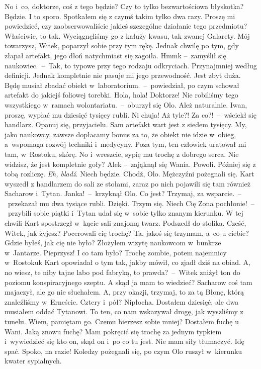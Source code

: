 \documentclass[../MAIN.tex]{subfiles}
\begin{document}
\sx No i~co, doktorze, coś z tego będzie? Czy to tylko bezwartościowa błyskotka?
\xx Będzie. I to sporo. Spotkałem się z czymś takim tylko dwa razy. Proszę mi powiedzieć, czy zaobserwowaliście jakieś szczególne działanie tego przedmiotu?
\xx Właściwie, to tak. Wyciągnęliśmy go z kałuży kwasu, tak zwanej Galarety. Mój towarzysz, Witek, poparzył sobie przy tym rękę. Jednak chwilę po tym, gdy złapał artefakt, jego dłoń natychmiast się zagoiła.
\xx Hmm\3k --~zamyślił się naukowiec.~--~Tak, to typowe przy tego rodzaju odkryciach. Przynajmniej według definicji. Jednak kompletnie nie pasuje mi jego przewodność. Jest zbyt duża. Będę musiał zbadać obiekt w~laboratorium.~--~powiedział, po czym schował artefakt do jakiejś foliowej torebki.
\xx Hola, hola! Doktorze! Nie robiliśmy tego wszystkiego w~ramach wolontariatu.~--~oburzył się Olo.
\xx Ależ naturalnie. Iwan, proszę, wypłać mu dziesięć tysięcy rubli.
\xx Ni chuja! Aż tyle?! Za co?!~--~wściekł się handlarz.
\xx Opanuj się, przyjacielu. Sam artefakt wart jest z siedem tysięcy. My, jako naukowcy, zawsze dopłacamy bonus za to, że obiekt nie idzie w~obieg, a~wspomaga rozwój techniki i~medycyny. Poza tym, ten człowiek uratował mi tam, w~Rostoku, skórę. No i~wreszcie, sypię mu trochę z dobrego serca. Nie widzisz, że jest kompletnie goły?
\xx Ale\3k --~zająknął się Wania.
\xx Powoli. Później się z tobą rozliczę.
\xx \textit{Eh, bladź}. Niech będzie. Chodź, Olo.
\qd
\hspace{17.6em}Mężczyźni pożegnali się. Kart wyszedł z handlarzem do sali ze stołami, zaraz po nich pojawili się tam również Sacharow i~Tytan.
\sx Janka!~--~krzyknął Olo.
\xx Co jest?
\xx Trzymaj, za wsparcie.~--~przekazał mu dwa tysiące rubli.
\xx Dzięki. Trzym się. Niech Cię Zona pochłonie!~--~przybili sobie piątki i~Tytan udał się w~sobie tylko znanym kierunku.
\qd
\hspace{15.5em}W tej chwili Kart spostrzegł w~kącie sali znajomą twarz. Podszedł do stolika.
\sx Cześć, Witek, jak żyjesz? Pocerowali cię trochę?
\xx Ta, jakoś się trzymam, a~co u ciebie? Gdzie byłeś, jak cię nie było?
\xx Złożyłem wizytę naukowcom w~bunkrze w~Jantarze.
\xx Pieprzysz! I co tam było?
\xx Trochę zombie, potem najemnicy w~Rostoku\3k \x Kart opowiadał o tym tak, jakby mówił, co zjadł dziś na obiad.
\xx A, no wiesz, te niby tajne labo pod fabryką, to prawda?~--~Witek zniżył ton do poziomu konspiracyjnego szeptu.
\xx A skąd ja mam to wiedzieć? Sacharow coś tam majaczył, ale go nie słuchałem. A, przy okazji, trzymaj, to za tą Błonę, którą znaleźliśmy w~Erneście.
\xx Cztery i~pół? Nipłocha.
\xx Dostałem dziesięć, ale dwa musiałem oddać Tytanowi. To ten, co nam wskazywał drogę, jak wyszliśmy z tunelu.
\xx Wiem, pamiętam go. Czemu bierzesz sobie mniej?
\xx Dostałem fuchę u Wani.
\xx Jaką znowu fuchę?
\xx Mam pokręcić się trochę za jednym typkiem i~wywiedzieć się kto on, skąd on i~po co tu jest. Nie mam siły tłumaczyć. Idę spać.
\xx Spoko, na razie!
\qd
\hspace{8.0em}Koledzy pożegnali się, po czym Olo ruszył w~kierunku kwater sypialnych.
\end{document}
